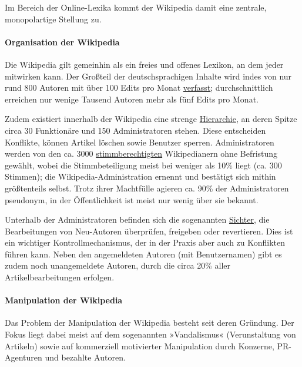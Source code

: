 Im Bereich der Online-Lexika kommt der Wikipedia damit eine zentrale,
monopolartige Stellung zu.

\hypertarget{organisation-der-wikipedia}{%
\paragraph{Organisation der
Wikipedia}\label{organisation-der-wikipedia}}

Die Wikipedia gilt gemeinhin als ein freies und offenes Lexikon, an dem
jeder mitwirken kann. Der Großteil der deutschsprachigen Inhalte wird
indes von nur rund 800 Autoren mit über 100 Edits pro Monat
\href{https://stats.wikimedia.org/DE/TablesWikipediansEditsGt100.htm}{verfasst};
durchschnittlich erreichen nur wenige Tausend Autoren mehr als fünf
Edits pro Monat.

Zudem existiert innerhalb der Wikipedia eine strenge
\href{https://commons.wikimedia.org/wiki/File:Vereinfachtes_Benutzergruppenschema_dewiki.svg}{Hierarchie},
an deren Spitze circa 30 Funktionäre und 150 Administratoren stehen.
Diese entscheiden Konflikte, können Artikel löschen sowie Benutzer
sperren. Administratoren werden von den ca. 3000
\href{https://de.wikipedia.org/wiki/Wikipedia:Stimmberechtigung}{stimmberechtigten}
Wikipedianern ohne Befristung gewählt, wobei die Stimmbeteiligung meist
bei weniger als 10\% liegt (ca. 300 Stimmen); die
Wikipedia-Administration ernennt und bestätigt sich mithin größtenteils
selbst. Trotz ihrer Machtfülle agieren ca. 90\% der Administratoren
pseudonym, in der Öffentlichkeit ist meist nur wenig über sie bekannt.

Unterhalb der Administratoren befinden sich die sogenannten
\href{https://de.wikipedia.org/wiki/Wikipedia:Gesichtete_Versionen}{Sichter},
die Bearbeitungen von Neu-Autoren überprüfen, freigeben oder
revertieren. Dies ist ein wichtiger Kontrollmechanismus, der in der
Praxis aber auch zu Konflikten führen kann. Neben den angemeldeten
Autoren (mit Benutzernamen) gibt es zudem noch unangemeldete Autoren,
durch die circa 20\% aller Artikelbearbeitungen erfolgen.

\hypertarget{manipulation-der-wikipedia}{%
\paragraph{Manipulation der
Wikipedia}\label{manipulation-der-wikipedia}}

Das Problem der Manipulation der Wikipedia besteht seit deren Gründung.
Der Fokus liegt dabei meist auf dem sogenannten »Vandalismus«
(Verunstaltung von Artikeln) sowie auf kommerziell motivierter
Manipulation durch Konzerne, PR-Agenturen und bezahlte Autoren.

